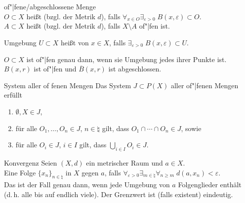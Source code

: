 \begin{Def}{of"|fene/abgeschlossene Menge}\\
    $O \subset X$ heißt  (bzgl. der Metrik $d$), falls
    $\forall_{x \in O} \exists_{\varepsilon > 0}\;
    B(x, \varepsilon) \subset O$. \\
    $A \subset X$ heißt  (bzgl. der Metrik $d$),
    falls $X \setminus A$ of"|fen ist.
\end{Def}

\begin{Def}{Umgebung}
    $U \subset X$ heißt  von $x \in X$, falls
    $\exists_{\varepsilon > 0}\; B(x, \varepsilon) \subset U$.
\end{Def}

\begin{Bsp}
    $O \subset X$ ist of"|fen genau dann, wenn sie Umgebung jedes ihrer Punkte
    ist. \\
    $B(x, r)$ ist of"|fen und $\overline{B}(x, r)$ ist abgeschlossen.
\end{Bsp}

\begin{Satz}{System aller of \!\!fenen Mengen}
    Das System $J \subset P(X)$ aller of"|fenen Mengen erfüllt
    \begin{enumerate}[label=(O\arabic*)]
        \item
        $\emptyset, X \in J$,

        \item
        für alle $O_1, \dotsc, O_n \in J$, $n \in \natural$ gilt, dass
        $O_1 \cap \dotsb \cap O_n \in J$, sowie

        \item
        für alle $O_i \in J$, $i \in I$ gilt, dass
        $\bigcup_{i \in I} O_i \in J$.
    \end{enumerate}
\end{Satz}

\linie

\begin{Def}{Konvergenz}
    Seien $(X, d)$ ein metrischer Raum und $a \in X$. \\
    Eine Folge $\{x_n\}_{n \in \natural}$ in $X$
     gegen $a$, falls
    $\forall_{\varepsilon > 0} \exists_{m \in \natural} \forall_{n \ge m}\;
    d(a, x_n) < \varepsilon$. \\
    Das ist der Fall genau dann, wenn jede Umgebung von $a$ 
    Folgenglieder enthält \\
    (d.\,h. alle bis auf endlich viele).
    Der Grenzwert ist (falls existent) eindeutig.
\end{Def}

